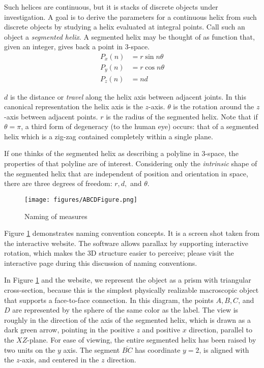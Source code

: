 \documentclass[11pt]{article}
\begin{document}
{Such helices are continuous, but it is stacks of discrete objects under investigation.
A goal is to derive
the parameters for a continuous helix from such discrete objects by studying
a helix evaluated at integral points. Call such an object a {\em segmented helix}.
A segmented helix may be thought of as function that, given an integer, gives back a point in
3-space.
\begin{align}
    P_x(n) &= r \sin{n \theta}  \\
    P_y(n) &= r \cos{n \theta} \\
   P_z(n) &= n d
\end{align}

$d$ is the distance or {\em travel} along the helix axis between adjacent joints. In this canonical representation the helix axis is
the $z$-axis.
$\theta$ is the rotation around the $z$-axis
between adjacent points.
$r$ is the radius of the segmented helix.
Note that if $\theta = \pi$, a third form of degeneracy (to the human eye) occurs:
that of a segmented helix
which is a zig-zag contained completely within a single plane.

If one thinks of the segmented helix as describing a polyline in 3-space,
the properties of that polyline are of interest.
Considering only the {\em intrinsic} shape of the segmented helix that
are independent of position and orientation in space,
there are three degrees
of freedom: $r,d,$ and $\theta$.

\begin{figure}
     \centering
     \texttt{[image: figures/ABCDFigure.png]}
     \caption{Naming of measures}
  \label{fig:naming}
\end{figure}

Figure \ref{fig:naming} demonstrates naming convention concepts.
It is a screen shot taken from the interactive website\cite{segmentedhelixinteractive}.
The software allows parallax by supporting interactive rotation,
which makes the 3D structure easier to perceive;
please visit the interactive page during this discussion of naming conventions.

In Figure \ref{fig:naming} and the website, we represent the object as a prism
with triangular cross-section, because this is
the simplest physically realizable macroscopic object that supports a face-to-face connection.
In this diagram, the
points $A,B,C$, and $D$ are represented by the sphere of the same color as the label. The view is roughly in the direction of
the axis of the segmented helix, which is drawn as a dark green arrow, pointing in the positive $z$ and positive $x$ direction,
parallel to the $XZ$-plane.
For ease of viewing, the entire segmented helix has been raised by two units on the $y$ axis.
The segment $\overline{BC}$ has coordinate $y = 2$, is aligned with the $z$-axis, and centered in the $z$ direction.

}
\end{document}
